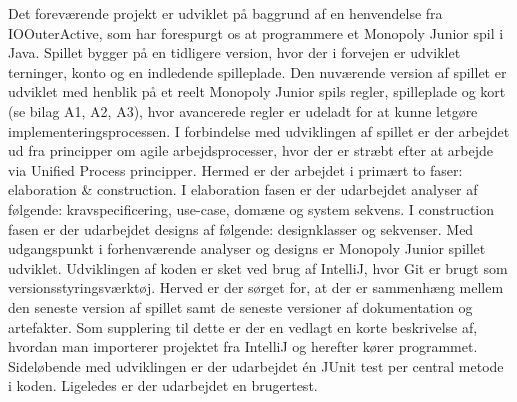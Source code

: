 \begin{flushleft} %
\doublespacing

Det foreværende projekt er udviklet på baggrund af  en henvendelse fra IOOuterActive, som har forespurgt os at programmere et Monopoly Junior spil i Java. Spillet bygger på en tidligere version, hvor der i forvejen er udviklet terninger, konto og en indledende spilleplade. Den nuværende version af spillet er udviklet med henblik på et reelt Monopoly Junior spils regler, spilleplade og kort (se bilag A1, A2, A3), hvor avancerede regler er udeladt for at kunne letgøre implementeringsprocessen. 
\addlinespace
I forbindelse med udviklingen af spillet er der arbejdet ud fra principper om agile arbejdsprocesser, hvor der er stræbt efter at arbejde via Unified Process principper. Hermed er der arbejdet i primært to faser: elaboration & construction. I elaboration fasen er der udarbejdet analyser af følgende: kravspecificering, use-case, domæne og system sekvens. I construction fasen er der udarbejdet designs af følgende: designklasser og sekvenser. Med udgangspunkt i forhenværende analyser og designs er Monopoly Junior spillet udviklet.
\addlinespace
Udviklingen af koden er sket ved brug af IntelliJ, hvor Git er brugt som versionsstyringsværktøj. Herved er der sørget for, at der er sammenhæng mellem den seneste version af spillet samt de seneste versioner af dokumentation og artefakter. Som supplering til dette er der en vedlagt en korte beskrivelse af, hvordan man importerer projektet fra IntelliJ og herefter kører programmet.
\addlinespace
Sideløbende med udviklingen er der udarbejdet én JUnit test per central metode i koden. Ligeledes er der udarbejdet en brugertest. 


\end{flushleft}